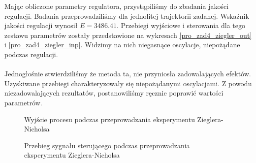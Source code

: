 Mając obliczone parametry regulatora, przystąpiliśmy do zbadania jakości regulacji.
Badania przeprowadziliśmy dla jednolitej trajektorii zadanej.
Wskaźnik jakości regulacji wynosił $E = \num{3486.41}$. Przebiegi wyjściowe i 
sterowania dla tego zestawu parametrów zostały przedstawione na wykresach
\ref{pro_zad4_ziegler_out} i \ref{pro_zad4_ziegler_inp}. 
Widzimy na nich niegasnące oscylacje, niepożądane podczas regulacji. \\
\\
\indent Jednogłośnie stwierdziliśmy że metoda ta, nie przyniosła zadowalających 
efektów. Uzyskiwane przebiegi charakteryzowały się niepożądanymi oscylacjami.
Z powodu niezadowalających rezultatów, postanowiliśmy ręcznie poprawić 
wartości parametrów.

\begin{figure}[t]
    \centering
    \caption{Wyjście procesu podczas przeprowadzania eksperymentu Zieglera-Nicholsa}
    \label{pro_zad4_niegasnace_oscylacje_out}
\end{figure}

\begin{figure}[b]
    \centering
    \caption{Przebieg sygnału sterującego podczas przeprowadzania eksperymentu Zieglera-Nicholsa}
    \label{pro_zad4_niegasnace_oscylacje_inp}
\end{figure}


